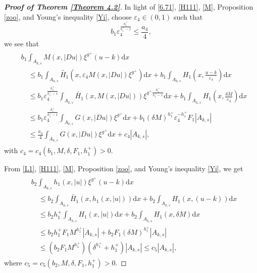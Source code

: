 \documentclass[10pt,reqno]{amsart}
\newcommand *\w{^\wedge}
\theoremstyle{definition}
\numberwithin{equation}{section}
\begin{document}
\begin{proof}[\textbf{Proof of Theorem \ref{Theorem 4.2}}]
 In light of \eqref{6.71}, \eqref{H111}, \eqref{M}, Proposition \ref{zoo}, and Young's inequality \eqref{Yi}, choose \(\varepsilon_4 \in (0,1)\) such that
\[
b_1 \varepsilon_4^{\frac{h^+_1}{h^+_1-1}} \leq \frac{a_4}{4},
\]
we see that
\begin{align}\label{33eq}
    \begin{split}
        &b_1 \int_{A_{k,s}} M(x,|Du|) \xi^{g^+} (u - k)  \mathrm{d}x \\
        &\quad \leq b_1 \int_{A_{k,s}} \widetilde{H_1}\left(x, \varepsilon_4 M(x,|Du|) \xi^{g^+}\right)  \mathrm{d}x + b_1 \int_{A_{k,s}} H_1\left(x, \frac{u - k}{\varepsilon_4}\right)  \mathrm{d}x \\
        &\quad \leq b_1 \varepsilon_4^{\frac{h^+_1}{h^+_1-1}} \int_{A_{k,s}} \widetilde{H_1}\left(x, M(x,|Du|) \right) \xi^{g^+\frac{h^+_1}{h^+_1-1}}  \mathrm{d}x + b_1 \int_{A_{k,s}} H_1\left(x, \frac{\delta M}{\varepsilon_4}\right)  \mathrm{d}x \\
        &\quad \leq b_1 \varepsilon_4^{\frac{h^+_1}{h^+_1-1}} \int_{A_{k,s}} G(x,|Du|) \xi^{g^+}  \mathrm{d}x + b_1 (\delta M)^{h_1^+} \varepsilon_4^{-h^+_1} F_1 |A_{k,s}| \\
        &\quad \leq \frac{a_4}{4} \int_{A_{k,s}} G(x,|Du|) \xi^{g^+}  \mathrm{d}x + c_4 |A_{k,s}|,
    \end{split}
\end{align}
with \(c_4 = c_4(b_1, M, \delta, F_1, h_1^+) > 0\).

 From \eqref{L1}, \eqref{H111}, \eqref{M}, Proposition \ref{zoo}, and Young's inequality \eqref{Yi}, we get
\begin{align}\label{44eq}
    \begin{split}
        &b_2 \int_{A_{k,s}} h_1(x,|u|) \xi^{g^+} (u - k)  \mathrm{d}x \\
        &\quad \leq b_2 \int_{A_{k,s}} \widetilde{H_1}\left(x, h_1(x,|u|)\right)  \mathrm{d}x + b_2 \int_{A_{k,s}} H_1(x, (u - k))  \mathrm{d}x \\
        &\quad \leq b_2 h^+_1 \int_{A_{k,s}} H_1\left(x, |u|\right)  \mathrm{d}x + b_2 \int_{A_{k,s}} H_1(x, \delta M)  \mathrm{d}x \\
        &\quad \leq b_2 h^+_1 F_1 M^{h_1^+} |A_{k,s}| + b_2 F_1 (\delta M)^{h^+_1} |A_{k,s}| \\
        &\quad \leq \left(b_2 F_1 M^{h_1^+}\right) \left(\delta ^{h^+_1} + h_1^+ \right) |A_{k,s}| \leq c_5 |A_{k,s}|,
    \end{split}
\end{align}
where \(c_5 = c_5(b_2, M, \delta, F_1, h_1^+) > 0\).


\end{proof}
\end{document}
